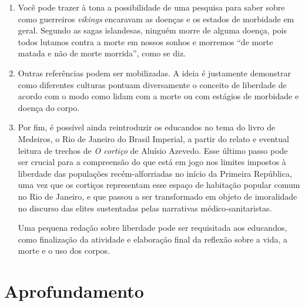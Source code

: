 \documentclass[12pt]{extarticle}
\begin{document}
\begin{enumerate}
\item Você pode trazer à tona a possibilidade de uma pesquisa para saber sobre
como guerreiros \emph{vikings} encaravam as doenças e os estados de morbidade
em geral. Segundo as sagas islandesas, ninguém morre de alguma doença,
pois todos lutamos contra a morte em nossos sonhos e morremos ``de morte
matada e não de morte morrida'', como se diz.

\item Outras referências podem ser mobilizadas. A ideia é justamente
demonstrar como diferentes culturas pontuam diversamente o conceito de
liberdade de acordo com o modo como lidam com a morte ou com estágios de
morbidade e doença do corpo.

\item Por fim, é possível ainda reintroduzir os educandos no tema do livro de
Medeiros, o Rio de Janeiro do Brasil Imperial, a partir do relato e
eventual leitura de trechos de \emph{O cortiço} de Aluísio Azevedo. Esse
último passo pode ser crucial para a compreensão do que está em jogo nos
limites impostos à liberdade das populações recém-alforriadas no início
da Primeira República, uma vez que os cortiços representam esse espaço
de habitação popular comum no Rio de Janeiro, e que passou a ser
transformado em objeto de imoralidade no discurso das elites sustentadas
pelas narrativas médico-sanitaristas.

Uma pequena redação sobre liberdade pode ser requisitada aos
educandos, como finalização da atividade e elaboração final da reflexão
sobre a vida, a morte e o uso dos corpos.
\end{enumerate}

\section{Aprofundamento}

\end{document}
